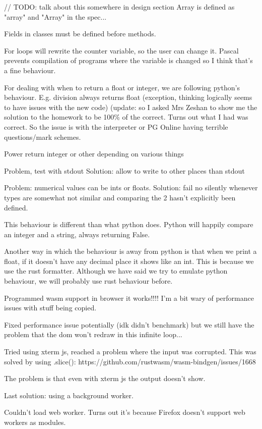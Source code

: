 \documentclass{article}
\begin{document}
// TODO: talk about this somewhere in design section
Array is defined as "array" and "Array" in the spec...

Fields in classes must be defined before methods.

For loops will rewrite the counter variable, so the user can change it.
Pascal prevents compilation of programs where the variable is changed so I
think that's a fine behaviour.

For dealing with when to return a float or integer, we are following python's
behaviour. E.g. division always returns float (exception, thinking logically
seems to have issues with the new code) (update: so I asked Mrs Zeshan to show
me the solution to the homework to be 100\% of the correct. Turns out what I
had was correct. So the issue is with the interpreter or PG Online having
terrible questions/mark schemes.

Power return integer or other depending on various things

Problem, test with stdout
Solution: allow to write to other places than stdout

Problem: numerical values can be ints or floats.
Solution: fail no silently whenever types are somewhat not similar and
comparing the 2 hasn't explicitly been defined.

This behaviour is different than what python does. Python will happily compare
an integer and a string, always returning False.

Another way in which the behaviour is away from python is that when we print a
float, if it doesn't have any decimal place it shows like an int. This is
because we use the rust formatter. Although we have said we try to emulate
python behaviour, we will probably use rust behaviour before.

Programmed wasm support in browser it works!!!! I'm a bit wary of performance
issues with stuff being copied.

Fixed performance issue potentially (idk didn't benchmark) but we still have
the problem that the dom won't redraw in this infinite loop...

Tried using xterm js, reached a problem where the input was corrupted. This was
solved by using .slice(): https://github.com/rustwasm/wasm-bindgen/issues/1668

The problem is that even with xterm js the output doesn't show.

Last solution: using a background worker.

Couldn't load web worker. Turns out it's because Firefox doesn't support web
workers as modules.
\end{document}
